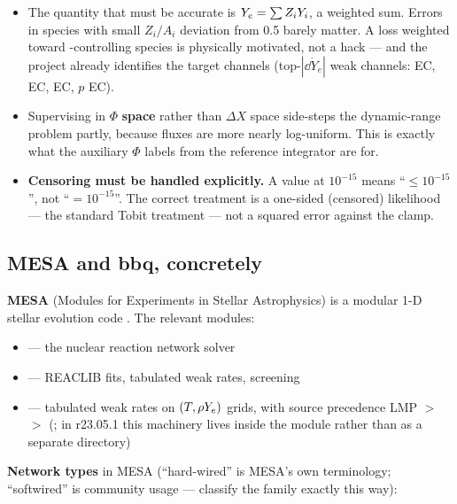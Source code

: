 \begin{itemize}
\item The quantity that must be accurate is $Y_{e} = \sum Z_i Y_i$, a weighted
      sum. Errors in species with small $Z_i/A_i$ deviation from 0.5 barely
      matter. A loss weighted toward \Ye{}-controlling species is physically
      motivated, not a hack --- and the project already identifies the target
      channels (top-$|\dd\dot{Y}_e|$ weak channels:  EC,
       EC,  EC, $p$ EC).
\item Supervising in $\Phi$ \textbf{space} rather than $\Delta X$ space
      side-steps the dynamic-range problem partly, because fluxes are more
      nearly log-uniform. This is exactly what the auxiliary $\Phi$ labels from
      the reference integrator are for.
\item \textbf{Censoring must be handled explicitly.} A value at $10^{-15}$ means
      ``$\leq 10^{-15}$'', not ``$= 10^{-15}$''. The correct treatment is a
      one-sided (censored) likelihood --- the standard Tobit treatment
      \citep{tobin1958} --- not a squared error against the clamp.
\end{itemize}

\subsection{MESA and bbq, concretely}
\label{sec:mesabbq}

\textbf{MESA} (Modules for Experiments in Stellar Astrophysics) is a modular 1-D
stellar evolution code \citep{paxton2011,jermyn2023}. The relevant modules:

\begin{itemize}
\item {} --- the nuclear reaction network solver
\item {} --- REACLIB fits, tabulated weak rates, screening
\item {} --- tabulated weak rates on $(T, \rho Y_{e})$ grids, with
      source precedence LMP $>$ \citeauthor{oda1994} $>$ \citeauthor{ffn} (\citealt{paxton2011}; in r23.05.1
      this machinery lives inside the  module rather than as a
      separate directory)
\end{itemize}

\textbf{Network types} in MESA (``hard-wired'' is MESA's own terminology;
``softwired'' is community usage --- \citealt{farmer2016} classify the
 family exactly this way):

